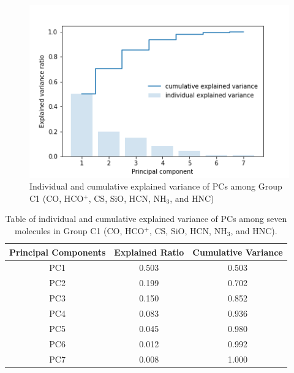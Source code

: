 \documentclass{aa}
\begin{document}
\begin{CJK*}{UTF8}{gbsn}
     \begin{figure}[htbp]
       \centering
       \captionsetup{justification=centering}
       \includegraphics[angle=0,scale = 0.6]{7/explained_variance_ratio.png}
       \caption{Individual and cumulative explained variance of PCs among Group C1 (CO, HCO$^+$, CS, SiO, HCN, NH$_3$, and HNC)}
             \label{Fig-cloud-7-variance}
      \end{figure}
   
     \begin{table}[htbp]
        \centering
        \begin{tabular}{ccc}
        \hline\hline
        \multicolumn{1}{l}{Principal Components} & \multicolumn{1}{l}{Explained Ratio} & Cumulative Variance \\ \hline
        PC1                                     & 0.503                               & 0.503               \\
        PC2                                     & 0.199                               & 0.702               \\
        PC3                                     & 0.150                               & 0.852               \\
        PC4                                     & 0.083                               & 0.936               \\
        PC5                                     & 0.045                               & 0.980               \\
        PC6                                     & 0.012                               & 0.992               \\
        PC7                                     & 0.008                               & 1.000   \\           \hline\hline
        \end{tabular}
        \caption{Table of individual and cumulative explained variance of PCs among seven molecules in Group C1 (CO, HCO$^+$, CS, SiO, HCN, NH$_3$, and HNC).}
        \label{table-cloud-1}
     \end{table}
   

\end{CJK*}
\end{document}
